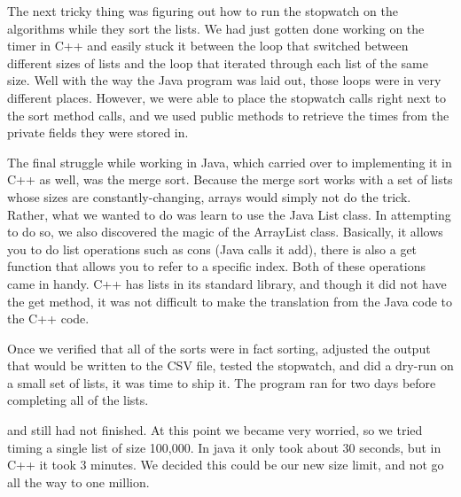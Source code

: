 The next tricky thing was figuring out how to run the stopwatch on the 
algorithms while they sort the lists. We had just gotten done working on the
timer in C++ and easily stuck it between the loop that switched between
different sizes of lists and the loop that iterated through each list of the
same size. Well with the way the Java program was laid out, those loops were in
very different places. However, we were able to place the stopwatch calls right
next to the sort method calls, and we used public methods to retrieve the times
from the private fields they were stored in.

The final struggle while working in Java, which carried over to implementing it
in C++ as well, was the merge sort. Because the merge sort works with a set of
lists whose sizes are constantly-changing, arrays would simply not do the trick.
Rather, what we wanted to do was learn to use the Java List class. In attempting
to do so, we also discovered the magic of the ArrayList class. Basically, it
allows you to do list operations such as cons (Java calls it add), there is also
a get function that allows you to refer to a specific index. Both of these
operations came in handy. C++ has lists in its standard library, and though it
did not have the get method, it was not difficult to make the translation from
the Java code to the C++ code.

Once we verified that all of the sorts were in fact sorting, adjusted the output
that would be written to the CSV file, tested the stopwatch, and did a dry-run
on a small set of lists, it was time to ship it. The program ran for two days
before completing all of the lists. 

and still had not finished. At this point we became very worried, so we tried
timing a single list of size 100,000. In java it only took about 30 seconds, but
in C++ it took 3 minutes. We decided this could be our new size limit, and not
go all the way to one million.
